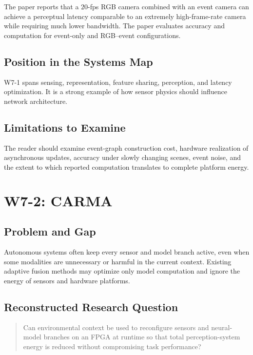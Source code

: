 The paper reports that a \(20\)-fps RGB camera combined with an event camera can achieve a perceptual latency comparable to an extremely high-frame-rate camera while requiring much lower bandwidth. The paper evaluates accuracy and computation for event-only and RGB--event configurations.

\subsection{Position in the Systems Map}

W7-1 spans sensing, representation, feature sharing, perception, and latency optimization. It is a strong example of how sensor physics should influence network architecture.

\subsection{Limitations to Examine}

The reader should examine event-graph construction cost, hardware realization of asynchronous updates, accuracy under slowly changing scenes, event noise, and the extent to which reported computation translates to complete platform energy.

\section{W7-2: CARMA}

\subsection{Problem and Gap}

Autonomous systems often keep every sensor and model branch active, even when some modalities are unnecessary or harmful in the current context. Existing adaptive fusion methods may optimize only model computation and ignore the energy of sensors and hardware platforms.

\subsection{Reconstructed Research Question}

\begin{quote}
Can environmental context be used to reconfigure sensors and neural-model branches on an FPGA at runtime so that total perception-system energy is reduced without compromising task performance?
\end{quote}


